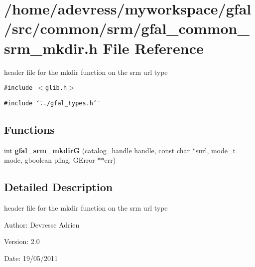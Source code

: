 \section{/home/adevress/myworkspace/gfal/src/common/srm/gfal\_\-common\_\-srm\_\-mkdir.h File Reference}
\label{gfal__common__srm__mkdir_8h}
header file for the mkdir function on the srm url type 

{\tt \#include $<$glib.h$>$}\par
{\tt \#include \char`\"{}../gfal\_\-types.h\char`\"{}}\par
\subsection*{Functions}
\begin{CompactItemize}
\item 
int \textbf{gfal\_\-srm\_\-mkdir\-G} (catalog\_\-handle handle, const char $\ast$surl, mode\_\-t mode, gboolean pflag, GError $\ast$$\ast$err)\label{gfal__common__srm__mkdir_8h_4e66d8088eeabd271fbb3a6d1b56d09f}

\end{CompactItemize}


\subsection{Detailed Description}
header file for the mkdir function on the srm url type 

\begin{Desc}
\item[Author:]Devresse Adrien \end{Desc}
\begin{Desc}
\item[Version:]2.0 \end{Desc}
\begin{Desc}
\item[Date:]19/05/2011 \end{Desc}
